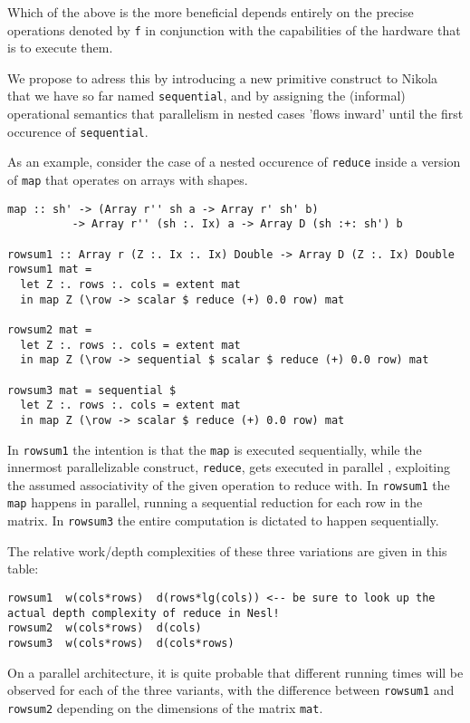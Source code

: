 Which of the above is the more beneficial depends entirely on the precise
operations denoted by \texttt{f} in conjunction with the capabilities of the
hardware that is to execute them.

We propose to adress this by introducing a new primitive construct to Nikola
that we have so far named \texttt{sequential}, and by assigning the (informal)
operational semantics that parallelism in nested cases 'flows inward' until the
first occurence of \texttt{sequential}.

As an example, consider the case of a nested occurence of \texttt{reduce}
inside a version of \texttt{map} that operates on arrays with shapes.


\begin{verbatim}
map :: sh' -> (Array r'' sh a -> Array r' sh' b)
          -> Array r'' (sh :. Ix) a -> Array D (sh :+: sh') b

rowsum1 :: Array r (Z :. Ix :. Ix) Double -> Array D (Z :. Ix) Double
rowsum1 mat =
  let Z :. rows :. cols = extent mat
  in map Z (\row -> scalar $ reduce (+) 0.0 row) mat

rowsum2 mat =
  let Z :. rows :. cols = extent mat
  in map Z (\row -> sequential $ scalar $ reduce (+) 0.0 row) mat

rowsum3 mat = sequential $
  let Z :. rows :. cols = extent mat
  in map Z (\row -> scalar $ reduce (+) 0.0 row) mat
\end{verbatim}

In \texttt{rowsum1} the intention is that the \texttt{map} is executed
sequentially, while the innermost parallelizable construct, \texttt{reduce},
gets executed in parallel , exploiting the assumed associativity of the
given operation to reduce with.  In \texttt{rowsum1} the \texttt{map} happens
in parallel, running a sequential reduction for each row in the matrix. In
\texttt{rowsum3} the entire computation is dictated to happen sequentially.

The relative work/depth complexities of these three variations are given in this table:

\begin{verbatim}
rowsum1  w(cols*rows)  d(rows*lg(cols)) <-- be sure to look up the actual depth complexity of reduce in Nesl!
rowsum2  w(cols*rows)  d(cols)
rowsum3  w(cols*rows)  d(cols*rows)
\end{verbatim}

On a parallel architecture, it is quite probable that different running times
will be observed for each of the three variants, with the difference between
\texttt{rowsum1} and \texttt{rowsum2} depending on the dimensions of the matrix
\texttt{mat}.
